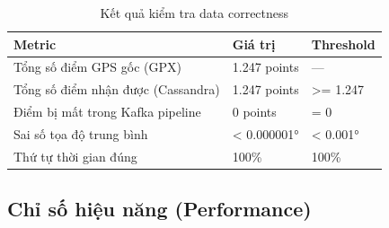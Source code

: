 \bigskip
\begin{table}[H]
\centering
\caption[Kết quả kiểm tra tính đúng đắn dữ liệu GPS]{Kết quả kiểm tra data correctness}
\label{tab:data-correctness}
\begin{tabular}{|p{4cm}|p{4cm}|p{4cm}|}
\hline
\textbf{Metric} & \textbf{Giá trị} & \textbf{Threshold} \\
\hline
Tổng số điểm GPS gốc (GPX) & 1.247 points & — \\
\hline
Tổng số điểm nhận được (Cassandra) & 1.247 points & \textgreater{}= 1.247 \\
\hline
Điểm bị mất trong Kafka pipeline & 0 points & = 0 \\
\hline
Sai số tọa độ trung bình & < 0.000001° & < 0.001° \\
\hline
Thứ tự thời gian đúng & 100\% & 100\% \\
\hline
\end{tabular}
\end{table}

\subsection{Chỉ số hiệu năng (Performance)}
\label{sec:performance}

